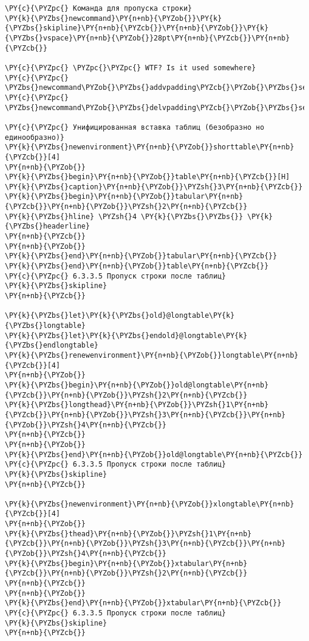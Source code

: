 \begin{Verbatim}[commandchars=\\\{\}]
\PY{c}{\PYZpc{} Команда для пропуска строки}
\PY{k}{\PYZbs{}newcommand}\PY{n+nb}{\PYZob{}}\PY{k}{\PYZbs{}skipline}\PY{n+nb}{\PYZcb{}}\PY{n+nb}{\PYZob{}}\PY{k}{\PYZbs{}vspace}\PY{n+nb}{\PYZob{}}28pt\PY{n+nb}{\PYZcb{}}\PY{n+nb}{\PYZcb{}} 

\PY{c}{\PYZpc{} \PYZpc{}\PYZpc{} WTF? Is it used somewhere}
\PY{c}{\PYZpc{} \PYZbs{}newcommand\PYZob{}\PYZbs{}addvpadding\PYZcb{}\PYZob{}\PYZbs{}setlength\PYZob{}\PYZbs{}extrarowheight\PYZcb{}\PYZob{}0cm\PYZcb{}\PYZcb{}}
\PY{c}{\PYZpc{} \PYZbs{}newcommand\PYZob{}\PYZbs{}delvpadding\PYZcb{}\PYZob{}\PYZbs{}setlength\PYZob{}\PYZbs{}extrarowheight\PYZcb{}\PYZob{}2cm\PYZcb{}\PYZcb{}}

\PY{c}{\PYZpc{} Унифицированная вставка таблиц (безобразно но единообразно)}
\PY{k}{\PYZbs{}newenvironment}\PY{n+nb}{\PYZob{}}shorttable\PY{n+nb}{\PYZcb{}}[4]
\PY{n+nb}{\PYZob{}}
\PY{k}{\PYZbs{}begin}\PY{n+nb}{\PYZob{}}table\PY{n+nb}{\PYZcb{}}[H]
\PY{k}{\PYZbs{}caption}\PY{n+nb}{\PYZob{}}\PYZsh{}3\PY{n+nb}{\PYZcb{}}
\PY{k}{\PYZbs{}begin}\PY{n+nb}{\PYZob{}}tabular\PY{n+nb}{\PYZcb{}}\PY{n+nb}{\PYZob{}}\PYZsh{}2\PY{n+nb}{\PYZcb{}}
\PY{k}{\PYZbs{}hline} \PYZsh{}4 \PY{k}{\PYZbs{}\PYZbs{}} \PY{k}{\PYZbs{}headerline}
\PY{n+nb}{\PYZcb{}}
\PY{n+nb}{\PYZob{}}
\PY{k}{\PYZbs{}end}\PY{n+nb}{\PYZob{}}tabular\PY{n+nb}{\PYZcb{}}
\PY{k}{\PYZbs{}end}\PY{n+nb}{\PYZob{}}table\PY{n+nb}{\PYZcb{}}
\PY{c}{\PYZpc{} 6.3.3.5 Пропуск строки после таблиц}
\PY{k}{\PYZbs{}skipline}
\PY{n+nb}{\PYZcb{}}

\PY{k}{\PYZbs{}let}\PY{k}{\PYZbs{}old}@longtable\PY{k}{\PYZbs{}longtable}
\PY{k}{\PYZbs{}let}\PY{k}{\PYZbs{}endold}@longtable\PY{k}{\PYZbs{}endlongtable}
\PY{k}{\PYZbs{}renewenvironment}\PY{n+nb}{\PYZob{}}longtable\PY{n+nb}{\PYZcb{}}[4]
\PY{n+nb}{\PYZob{}}
\PY{k}{\PYZbs{}begin}\PY{n+nb}{\PYZob{}}old@longtable\PY{n+nb}{\PYZcb{}}\PY{n+nb}{\PYZob{}}\PYZsh{}2\PY{n+nb}{\PYZcb{}}
\PY{k}{\PYZbs{}longthead}\PY{n+nb}{\PYZob{}}\PYZsh{}1\PY{n+nb}{\PYZcb{}}\PY{n+nb}{\PYZob{}}\PYZsh{}3\PY{n+nb}{\PYZcb{}}\PY{n+nb}{\PYZob{}}\PYZsh{}4\PY{n+nb}{\PYZcb{}}
\PY{n+nb}{\PYZcb{}}
\PY{n+nb}{\PYZob{}}
\PY{k}{\PYZbs{}end}\PY{n+nb}{\PYZob{}}old@longtable\PY{n+nb}{\PYZcb{}}
\PY{c}{\PYZpc{} 6.3.3.5 Пропуск строки после таблиц}
\PY{k}{\PYZbs{}skipline}
\PY{n+nb}{\PYZcb{}}

\PY{k}{\PYZbs{}newenvironment}\PY{n+nb}{\PYZob{}}xlongtable\PY{n+nb}{\PYZcb{}}[4]
\PY{n+nb}{\PYZob{}}
\PY{k}{\PYZbs{}thead}\PY{n+nb}{\PYZob{}}\PYZsh{}1\PY{n+nb}{\PYZcb{}}\PY{n+nb}{\PYZob{}}\PYZsh{}3\PY{n+nb}{\PYZcb{}}\PY{n+nb}{\PYZob{}}\PYZsh{}4\PY{n+nb}{\PYZcb{}}
\PY{k}{\PYZbs{}begin}\PY{n+nb}{\PYZob{}}xtabular\PY{n+nb}{\PYZcb{}}\PY{n+nb}{\PYZob{}}\PYZsh{}2\PY{n+nb}{\PYZcb{}}
\PY{n+nb}{\PYZcb{}}
\PY{n+nb}{\PYZob{}}
\PY{k}{\PYZbs{}end}\PY{n+nb}{\PYZob{}}xtabular\PY{n+nb}{\PYZcb{}}
\PY{c}{\PYZpc{} 6.3.3.5 Пропуск строки после таблиц}
\PY{k}{\PYZbs{}skipline}
\PY{n+nb}{\PYZcb{}}


\end{Verbatim}
